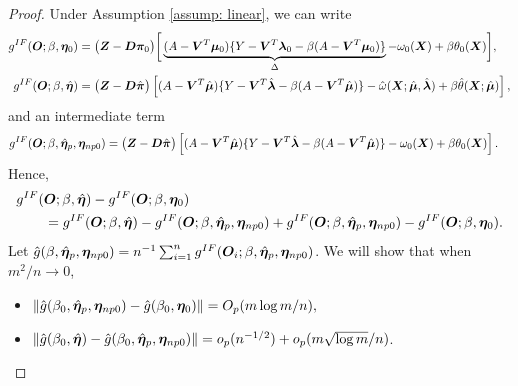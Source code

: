 \documentclass[12pt]{article}
\begin{document}
{\begin{proof}
Under Assumption \ref{assump: linear},  we can write
\begin{align*}
	g^{IF} (\bm O; \beta, \bm \eta_0)& =\big( \bm{Z}-\bm D \bm\pi_0 \big)  \bigg[ \underbrace{( A- \bm{V}^T \bm\mu_0 )\{ Y- \bm{V}^T \bm{\lambda}_{0} - \beta( A- \bm{V}^T \bm \mu_0 )  \}}_{\Delta} - \omega_0(\bm{X} ) +\beta \theta_0(\bm{X})\bigg],\\
		g^{IF} (\bm O; \beta, \hat {\bm \eta})& =\big( \bm{Z}-\bm D \hat{\bm\pi}\big) 
	\left[ ( A- \bm{V}^T \hat{\bm\mu} )\{ Y- \bm{V}^T \hat{\bm{\lambda}} - \beta( A- \bm{V}^T \hat{\bm \mu} )  \} - \hat \omega(\bm{X}; \hat{\bm \mu}, \hat{\bm \lambda} ) +\beta\hat \theta(\bm{X}; \hat{\bm \mu})\right],
\end{align*}
and an intermediate term
\begin{align*}
	g^{IF} (\bm O; \beta, \hat {\bm \eta}_{p},  \bm \eta_{np	0})& =\big( \bm{Z}-\bm D \hat{\bm\pi}\big)  \left[ ( A- \bm{V}^T \hat{\bm\mu} )\{ Y- \bm{V}^T \hat{\bm{\lambda}} - \beta( A- \bm{V}^T \hat{\bm \mu} )  \} -  \omega_0(\bm{X} ) +\beta \theta_0(\bm{X})\right].	
\end{align*}
Hence, 
\begin{align}
&	g^{IF} (\bm O; \beta, \hat{\bm \eta})  - 	g^{IF} (\bm O; \beta, \bm \eta_0) \nonumber\\
	&\qquad = 	g^{IF} (\bm O; \beta, \hat{\bm \eta})  - 		g^{IF} (\bm O; \beta, \hat {\bm \eta}_{p},  \bm \eta_{np0}) + 		g^{IF} (\bm O; \beta, \hat {\bm \eta}_{p},  \bm \eta_{np0})- g^{IF} (\bm O; \beta, \bm \eta_0). \nonumber
\end{align}
Let $  \hat 	g( \beta, \hat {\bm \eta}_{p},  \bm \eta_{np0}) = n^{-1}\sum_{i=1}^{n} 	g^{IF} (\bm O_i; \beta, \hat {\bm \eta}_{p},  \bm \eta_{np0}) $.  We will show that when $ m^2/n\rightarrow 0 $, 
\begin{itemize}
	\item[(a)] $ \| \hat 	g( \beta_0, \hat {\bm \eta}_{p},  \bm \eta_{np0})  - \hat g(\beta_0, \bm \eta_0) \| =  O_p(m\log m/n ),  $
	\item[(b)]  $ \|   \hat g(\beta_0,  \hat {\bm \eta}) - \hat 	g( \beta_0, \hat {\bm \eta}_{p},  \bm \eta_{np0})  \|= o_p(n^{-1/2})  + o_p( m\sqrt{\log m}/n)   $. 
\end{itemize}


\end{proof}}
\end{document}
